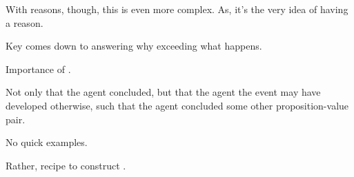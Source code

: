 \begin{note}
  With reasons, though, this is even more complex.
  As, it's the very idea of having a reason.
\end{note}

\begin{note}
  Key comes down to answering why exceeding what happens.

  Importance of \fc{}.

  Not only that the agent concluded, but that the agent the event may have developed otherwise, such that the agent concluded some other proposition-value pair.
\end{note}

\begin{note}
  No quick examples.

  Rather, recipe to construct .
\end{note}












